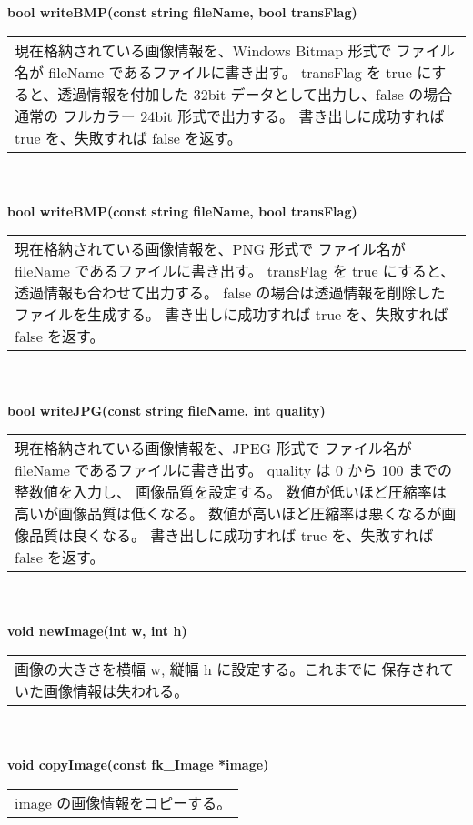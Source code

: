 \begin{tabbing}
\> \textbf{bool writeBMP(const string fileName, bool transFlag)} \\
	\> \> \begin{tabular}{p{15cm}}
		現在格納されている画像情報を、Windows Bitmap 形式で
		ファイル名が fileName であるファイルに書き出す。
		transFlag を true にすると、透過情報を付加した
		32bit データとして出力し、false の場合通常の
		フルカラー 24bit 形式で出力する。
		書き出しに成功すれば true を、失敗すれば false を返す。
	\end{tabular} \\ \\

\> \textbf{bool writeBMP(const string fileName, bool transFlag)} \\
	\> \> \begin{tabular}{p{15cm}}
		現在格納されている画像情報を、PNG 形式で
		ファイル名が fileName であるファイルに書き出す。
		transFlag を true にすると、透過情報も合わせて出力する。
		false の場合は透過情報を削除したファイルを生成する。
		書き出しに成功すれば true を、失敗すれば false を返す。
	\end{tabular} \\ \\

\> \textbf{bool writeJPG(const string fileName, int quality)} \\
	\> \> \begin{tabular}{p{15cm}}
		現在格納されている画像情報を、JPEG 形式で
		ファイル名が fileName であるファイルに書き出す。
		quality は 0 から 100 までの整数値を入力し、
		画像品質を設定する。
		数値が低いほど圧縮率は高いが画像品質は低くなる。
		数値が高いほど圧縮率は悪くなるが画像品質は良くなる。
		書き出しに成功すれば true を、失敗すれば false を返す。
	\end{tabular} \\ \\

\> \textbf{void newImage(int w, int h)} \\
	\> \> \begin{tabular}{p{15cm}}
		画像の大きさを横幅 w, 縦幅 h に設定する。これまでに
		保存されていた画像情報は失われる。
	\end{tabular} \\ \\

\> \textbf{void copyImage(const fk\_Image *image)} \\
	\> \> \begin{tabular}{p{15cm}}
		image の画像情報をコピーする。
	\end{tabular} \\ \\


\end{tabbing}
